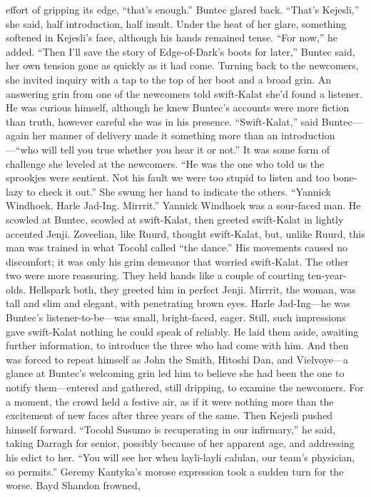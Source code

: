 \documentclass[9pt]{article}
\begin{document}
effort of gripping its edge, “that’s enough.”
Buntec glared back. “That’s Kejesli,” she said, half introduction, half insult. Under the heat of her
glare, something softened in Kejesli’s face, although his hands remained tense. “For now,” he added.
“Then I’ll save the story of Edge-of-Dark’s boots for later,” Buntec said, her own tension gone as
quickly as it had come. Turning back to the newcomers, she invited inquiry with a tap to the top of her
boot and a broad grin. An answering grin from one of the newcomers told swift-Kalat she’d found a
listener. He was curious himself, although he knew Buntec’s accounts were more fiction than truth,
however careful she was in his presence.
“Swift-Kalat,” said Buntec—again her manner of delivery made it something more than an
introduction—“who will tell you true whether you hear it or not.” It was some form of challenge she
leveled at the newcomers. “He was the one who told us the sprookjes were sentient. Not his fault we
were too stupid to listen and too bone-lazy to check it out.”
She swung her hand to indicate the others. “Yannick Windhoek. Harle Jad-Ing. Mirrrit.”
Yannick Windhoek was a sour-faced man. He scowled at Buntec, scowled at swift-Kalat, then
greeted swift-Kalat in lightly accented Jenji. Zoveelian, like Ruurd, thought swift-Kalat, but, unlike Ruurd,
this man was trained in what Tocohl called “the dance.” His movements caused no discomfort; it was
only his grim demeanor that worried swift-Kalat.
The other two were more reassuring. They held hands like a couple of courting ten-year-olds.
Hellspark both, they greeted him in perfect Jenji. Mirrrit, the woman, was tall and slim and elegant, with
penetrating brown eyes. Harle Jad-Ing—he was Buntec’s listener-to-be—was small, bright-faced, eager.
Still, such impressions gave swift-Kalat nothing he could speak of reliably. He laid them aside,
awaiting further information, to introduce the three who had come with him. And then was forced to
repeat himself as John the Smith, Hitoshi Dan, and Vielvoye—a glance at Buntec’s welcoming grin led
him to believe she had been the one to notify them—entered and gathered, still dripping, to examine the
newcomers.
For a moment, the crowd held a festive air, as if it were nothing more than the excitement of new
faces after three years of the same. Then Kejesli pushed himself forward. “Tocohl Susumo is
recuperating in our infirmary,” he said, taking Darragh for senior, possibly because of her apparent age,
and addressing his edict to her. “You will see her when layli-layli calulan, our team’s physician, so
permits.”
Geremy Kantyka’s morose expression took a sudden turn for the worse. Bayd Shandon frowned,
\end{document}
